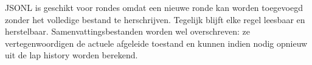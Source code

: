 JSONL is geschikt voor rondes omdat een nieuwe ronde kan worden toegevoegd zonder het volledige
bestand te herschrijven. Tegelijk blijft elke regel leesbaar en herstelbaar. Samenvattingsbestanden
worden wel overschreven: ze vertegenwoordigen de actuele afgeleide toestand en kunnen indien nodig
opnieuw uit de lap history worden berekend.
